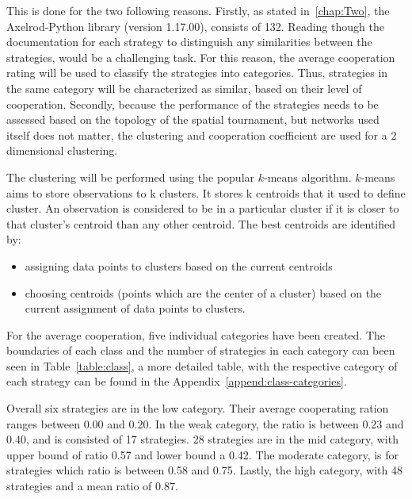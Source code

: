 This is done for the two following reasons. Firstly, as stated in~\autoref{chap:Two},
the Axelrod-Python library (version 1.17.00), consists of 132. Reading though
the documentation for each strategy to distinguish any similarities between
the strategies, would be a challenging task. For this reason, the average cooperation
rating will be used to classify the strategies into categories. Thus, strategies
in the same category will be characterized as similar, based on their level of
cooperation. Secondly, because the performance of the strategies needs to be assessed
based on the topology of the spatial tournament, but networks used itself does
not matter, the clustering and cooperation coefficient are used for a 2 dimensional
clustering.

The clustering will be performed using the popular \(k\)-means algorithm.
\(k\)-means aims to store observations to k clusters. It stores k centroids
that it used to define cluster. An observation is considered to be in a
particular cluster if it is closer to that cluster's centroid than any other
centroid. The best centroids are identified by:
\begin{itemize}
	\item assigning data points to clusters based on the current centroids
	\item choosing centroids (points which are the center of a cluster) based on
	      the current assignment of data points to clusters.
\end{itemize}

For the average cooperation, five individual categories have been created.
The boundaries of each class and the number of strategies in each category
can been seen in Table~\ref{table:class}, a more detailed table, with the respective category of each
strategy can be found in the Appendix~\ref{append:class-categories}.

Overall six strategies are in the low category. Their average cooperating ration
ranges between 0.00 and 0.20. In the weak category, the ratio is between
0.23 and 0.40, and is consisted of 17 strategies. 28 strategies are
in the mid category, with upper bound of ratio 0.57 and lower bound a 0.42.
The moderate category, is for strategies which ratio is between 0.58 and 0.75.
Lastly, the high category, with 48 strategies and a mean ratio of 0.87.


